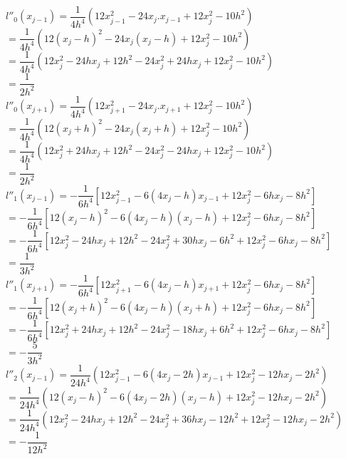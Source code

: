 \documentclass[14pt,a4paper]{article}
\begin{document}
\begin{enumerate}
	$l''_0(x_{j-1}) = \dfrac{1}{4h^4} (12x_{j-1}^2 - 24x_j.x_{j-1} + 12x_j^2 -10h^2)$\\
	\hspace*{1.4cm} $ = \dfrac{1}{4h^4} (12(x_j-h)^2 - 24x_j(x_j-h) + 12x_j^2 -10h^2)$\\
	\hspace*{1.4cm} $ = \dfrac{1}{4h^4} (12x_j^2 -24hx_j +12h^2 - 24x_j^2 +24hx_j + 12x_j^2 -10h^2)$\\
	\hspace*{1.4cm} $ = \dfrac{1}{2h^2}$\\
	
	$l''_0(x_{j+1}) = \dfrac{1}{4h^4} (12x_{j+1}^2 - 24x_j.x_{j+1} + 12x_j^2 -10h^2)$\\
	\hspace*{1.4cm} $ = \dfrac{1}{4h^4} (12(x_j+h)^2 - 24x_j(x_j+h) + 12x_j^2 -10h^2)$\\
	\hspace*{1.4cm} $ = \dfrac{1}{4h^4} (12x_j^2 +24hx_j +12h^2 - 24x_j^2 -24hx_j + 12x_j^2 -10h^2)$\\
	\hspace*{1.4cm} $ = \dfrac{1}{2h^2}$\\
	
	$l''_1(x_{j-1}) = -\dfrac{1}{6h^4} [12x_{j-1}^2 -6(4x_j-h)x_{j-1} + 12x_j^2 -6hx_j -8h^2]$\\
	\hspace*{1.4cm} $ = -\dfrac{1}{6h^4} [12(x_j-h)^2 -6(4x_j-h)(x_j-h) + 12x_j^2 -6hx_j -8h^2]$\\
	\hspace*{1.4cm} $ = -\dfrac{1}{6h^4} [12x_j^2 -24hx_j +12h^2 -24x_j^2 +30hx_j -6h^2 + 12x_j^2 -6hx_j -8h^2]$\\
	\hspace*{1.4cm} $ = \dfrac{1}{3h^2}$\\
	
	$l''_1(x_{j+1}) = -\dfrac{1}{6h^4} [12x_{j+1}^2 -6(4x_j-h)x_{j+1} + 12x_j^2 -6hx_j -8h^2]$\\
	\hspace*{1.4cm} $ = -\dfrac{1}{6h^4} [12(x_j+h)^2 -6(4x_j-h)(x_j+h) + 12x_j^2 -6hx_j -8h^2]$\\
	\hspace*{1.4cm} $ = -\dfrac{1}{6h^4} [12x_j^2 +24hx_j +12h^2 -24x_j^2 -18hx_j +6h^2 + 12x_j^2 -6hx_j -8h^2]$\\
	\hspace*{1.4cm} $ = -\dfrac{5}{3h^2}$\\
	
	$l''_2(x_{j-1}) = \dfrac{1}{24h^4} (12x_{j-1}^2 -6(4x_j-2h)x_{j-1} + 12x_j^2 - 12hx_j -2h^2)$\\
	\hspace*{1.4cm} $ = \dfrac{1}{24h^4} (12(x_j-h)^2 -6(4x_j-2h)(x_j-h) + 12x_j^2 - 12hx_j -2h^2)$\\
	\hspace*{1.4cm} $ = \dfrac{1}{24h^4} (12x_j^2 -24hx_j +12h^2 -24x_j^2 +36hx_j -12h^2 + 12x_j^2 - 12hx_j -2h^2)$\\
	\hspace*{1.4cm} $ = -\dfrac{1}{12h^2}$\\
	

\end{enumerate}
\end{document}
